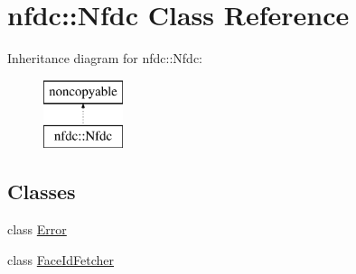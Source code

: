 \hypertarget{classnfdc_1_1Nfdc}{}\section{nfdc\+:\+:Nfdc Class Reference}
\label{classnfdc_1_1Nfdc}
Inheritance diagram for nfdc\+:\+:Nfdc\+:\begin{figure}[H]
\begin{center}
\leavevmode
\includegraphics[height=2.000000cm]{classnfdc_1_1Nfdc}
\end{center}
\end{figure}
\subsection*{Classes}
\begin{DoxyCompactItemize}
\item 
class \hyperlink{classnfdc_1_1Nfdc_1_1Error}{Error}
\item 
class \hyperlink{classnfdc_1_1Nfdc_1_1FaceIdFetcher}{Face\+Id\+Fetcher}
\end{DoxyCompactItemize}
